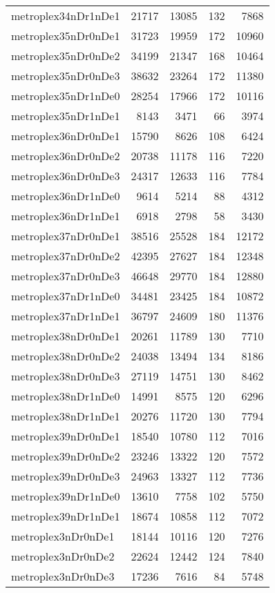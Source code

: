 \begin{longtable}{lrrrr}
metroplex34nDr1nDe1 & 21717 & 13085 & 132 & 7868 \\
metroplex35nDr0nDe1 & 31723 & 19959 & 172 & 10960 \\
metroplex35nDr0nDe2 & 34199 & 21347 & 168 & 10464 \\
metroplex35nDr0nDe3 & 38632 & 23264 & 172 & 11380 \\
metroplex35nDr1nDe0 & 28254 & 17966 & 172 & 10116 \\
metroplex35nDr1nDe1 & 8143 & 3471 & 66 & 3974 \\
metroplex36nDr0nDe1 & 15790 & 8626 & 108 & 6424 \\
metroplex36nDr0nDe2 & 20738 & 11178 & 116 & 7220 \\
metroplex36nDr0nDe3 & 24317 & 12633 & 116 & 7784 \\
metroplex36nDr1nDe0 & 9614 & 5214 & 88 & 4312 \\
metroplex36nDr1nDe1 & 6918 & 2798 & 58 & 3430 \\
metroplex37nDr0nDe1 & 38516 & 25528 & 184 & 12172 \\
metroplex37nDr0nDe2 & 42395 & 27627 & 184 & 12348 \\
metroplex37nDr0nDe3 & 46648 & 29770 & 184 & 12880 \\
metroplex37nDr1nDe0 & 34481 & 23425 & 184 & 10872 \\
metroplex37nDr1nDe1 & 36797 & 24609 & 180 & 11376 \\
metroplex38nDr0nDe1 & 20261 & 11789 & 130 & 7710 \\
metroplex38nDr0nDe2 & 24038 & 13494 & 134 & 8186 \\
metroplex38nDr0nDe3 & 27119 & 14751 & 130 & 8462 \\
metroplex38nDr1nDe0 & 14991 & 8575 & 120 & 6296 \\
metroplex38nDr1nDe1 & 20276 & 11720 & 130 & 7794 \\
metroplex39nDr0nDe1 & 18540 & 10780 & 112 & 7016 \\
metroplex39nDr0nDe2 & 23246 & 13322 & 120 & 7572 \\
metroplex39nDr0nDe3 & 24963 & 13327 & 112 & 7736 \\
metroplex39nDr1nDe0 & 13610 & 7758 & 102 & 5750 \\
metroplex39nDr1nDe1 & 18674 & 10858 & 112 & 7072 \\
metroplex3nDr0nDe1 & 18144 & 10116 & 120 & 7276 \\
metroplex3nDr0nDe2 & 22624 & 12442 & 124 & 7840 \\
metroplex3nDr0nDe3 & 17236 & 7616 & 84 & 5748 \\

\end{longtable}
